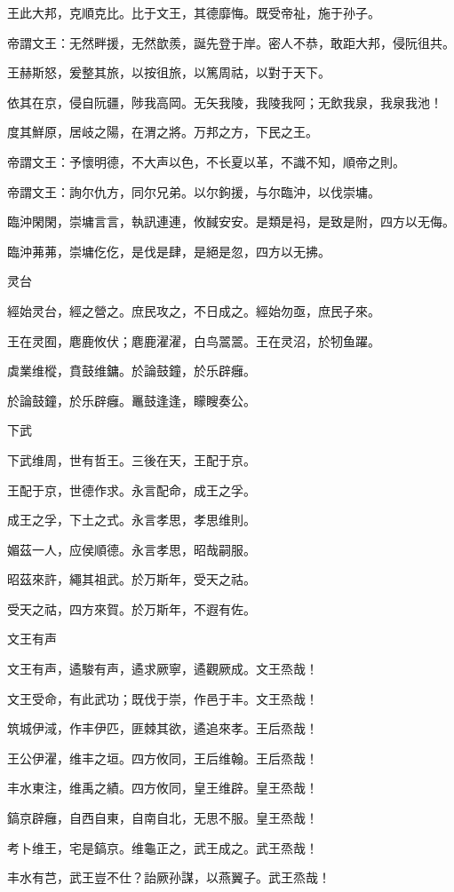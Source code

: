 王此大邦，克順克比。比于文王，其德靡悔。既受帝祉，施于孙子。

帝謂文王：无然畔援，无然歆羨，誕先登于岸。密人不恭，敢距大邦，侵阮徂共。

王赫斯怒，爰整其旅，以按徂旅，以篤周祜，以對于天下。

依其在京，侵自阮疆，陟我高岡。无矢我陵，我陵我阿；无飲我泉，我泉我池！

度其鮮原，居岐之陽，在渭之將。万邦之方，下民之王。

帝謂文王：予懷明德，不大声以色，不长夏以革，不識不知，順帝之則。

帝謂文王：詢尔仇方，同尔兄弟。以尔鉤援，与尔臨沖，以伐崇墉。

臨沖閑閑，崇墉言言，執訊連連，攸馘安安。是類是祃，是致是附，四方以无侮。

臨沖茀茀，崇墉仡仡，是伐是肆，是絕是忽，四方以无拂。

灵台

經始灵台，經之營之。庶民攻之，不日成之。經始勿亟，庶民子來。

王在灵囿，麀鹿攸伏；麀鹿濯濯，白鸟翯翯。王在灵沼，於牣鱼躍。

虡業维樅，賁鼓维鏞。於論鼓鐘，於乐辟癰。

於論鼓鐘，於乐辟癰。鼉鼓逢逢，矇瞍奏公。

下武

下武维周，世有哲王。三後在天，王配于京。

王配于京，世德作求。永言配命，成王之孚。

成王之孚，下土之式。永言孝思，孝思维則。

媚茲一人，应侯順德。永言孝思，昭哉嗣服。

昭茲來許，繩其祖武。於万斯年，受天之祜。

受天之祜，四方來賀。於万斯年，不遐有佐。

文王有声

文王有声，遹駿有声，遹求厥寧，遹觀厥成。文王烝哉！

文王受命，有此武功；既伐于崇，作邑于丰。文王烝哉！

筑城伊淢，作丰伊匹，匪棘其欲，遹追來孝。王后烝哉！

王公伊濯，维丰之垣。四方攸同，王后维翰。王后烝哉！

丰水東注，维禹之績。四方攸同，皇王维辟。皇王烝哉！

鎬京辟癰，自西自東，自南自北，无思不服。皇王烝哉！

考卜维王，宅是鎬京。维龜正之，武王成之。武王烝哉！

丰水有芑，武王豈不仕？詒厥孙謀，以燕翼子。武王烝哉！





